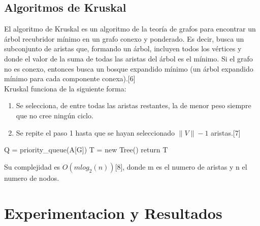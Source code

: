 \documentclass[spanish]{article}
\begin{document}
		\subsection{Algoritmos de Kruskal}			
			El algoritmo de Kruskal es un algoritmo de la teoría de grafos para encontrar un árbol recubridor mínimo en un grafo conexo y ponderado. Es decir, busca un subconjunto de aristas que, formando un árbol, incluyen todos los vértices y donde el valor de la suma de todas las aristas del árbol es el mínimo. Si el grafo no es conexo, entonces busca un bosque expandido mínimo (un árbol expandido mínimo para cada componente conexa).[6]\\ 
			Kruskal funciona de la siguiente forma:\\
			\begin{enumerate}
				\item     Se selecciona, de entre todas las aristas restantes, la de menor peso siempre que no cree ningún ciclo.
				\item Se repite el paso 1 hasta que se hayan seleccionado $\|V\| - 1$ aristas.[7]
			\end{enumerate}
			\begin{algorithm}[H]
				Q = priority\_queue(A[G])\;
				T = new Tree()\;
				return T\;
			\end{algorithm}	
			Su complejidad es $O(mlog_2(n))$[8], donde m es el numero de aristas y n el numero de nodos.
	\section{Experimentacion y Resultados}
\end{document}
